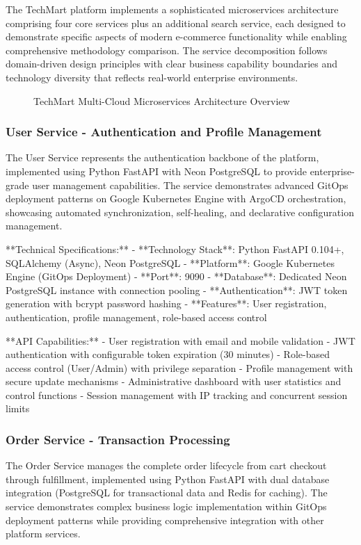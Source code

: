 The TechMart platform implements a sophisticated microservices architecture comprising four core services plus an additional search service, each designed to demonstrate specific aspects of modern e-commerce functionality while enabling comprehensive methodology comparison. The service decomposition follows domain-driven design principles with clear business capability boundaries and technology diversity that reflects real-world enterprise environments.

\begin{figure}[H]
\centering
\caption{TechMart Multi-Cloud Microservices Architecture Overview}
\label{fig:techmart-architecture-overview}
\end{figure}

\subsubsection{User Service - Authentication and Profile Management}
The User Service represents the authentication backbone of the platform, implemented using Python FastAPI with Neon PostgreSQL to provide enterprise-grade user management capabilities. The service demonstrates advanced GitOps deployment patterns on Google Kubernetes Engine with ArgoCD orchestration, showcasing automated synchronization, self-healing, and declarative configuration management.

**Technical Specifications:**
- **Technology Stack**: Python FastAPI 0.104+, SQLAlchemy (Async), Neon PostgreSQL
- **Platform**: Google Kubernetes Engine (GitOps Deployment)
- **Port**: 9090
- **Database**: Dedicated Neon PostgreSQL instance with connection pooling
- **Authentication**: JWT token generation with bcrypt password hashing
- **Features**: User registration, authentication, profile management, role-based access control

**API Capabilities:**
- User registration with email and mobile validation
- JWT authentication with configurable token expiration (30 minutes)
- Role-based access control (User/Admin) with privilege separation
- Profile management with secure update mechanisms
- Administrative dashboard with user statistics and control functions
- Session management with IP tracking and concurrent session limits

\subsubsection{Order Service - Transaction Processing}
The Order Service manages the complete order lifecycle from cart checkout through fulfillment, implemented using Python FastAPI with dual database integration (PostgreSQL for transactional data and Redis for caching). The service demonstrates complex business logic implementation within GitOps deployment patterns while providing comprehensive integration with other platform services.

